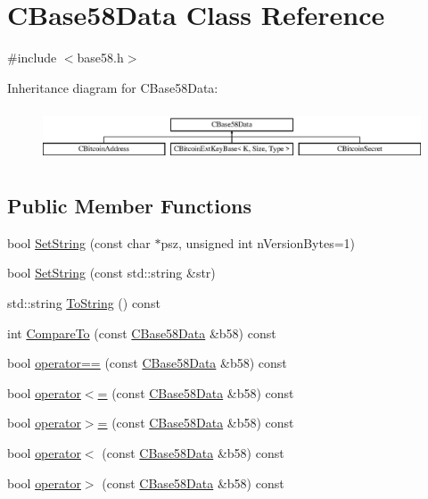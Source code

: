 \hypertarget{class_c_base58_data}{}\section{C\+Base58\+Data Class Reference}
\label{class_c_base58_data}


{\ttfamily \#include $<$base58.\+h$>$}

Inheritance diagram for C\+Base58\+Data\+:\begin{figure}[H]
\begin{center}
\leavevmode
\includegraphics[height=1.581921cm]{class_c_base58_data}
\end{center}
\end{figure}
\subsection*{Public Member Functions}
\begin{DoxyCompactItemize}
\item 
bool \hyperlink{class_c_base58_data_a250fa3bc97d03c7d87de5485c8b49b57}{Set\+String} (const char $\ast$psz, unsigned int n\+Version\+Bytes=1)
\item 
bool \hyperlink{class_c_base58_data_a8e0cba75a3e0a5b21defaf1471d8659c}{Set\+String} (const std\+::string \&str)
\item 
std\+::string \hyperlink{class_c_base58_data_a9a47b10dadff15b8d6a6d0e63ce3ae32}{To\+String} () const 
\item 
int \hyperlink{class_c_base58_data_ab3d18fd9671a383937af7dd4ac2e890a}{Compare\+To} (const \hyperlink{class_c_base58_data}{C\+Base58\+Data} \&b58) const 
\item 
bool \hyperlink{class_c_base58_data_af6448549abaf34142668540a338d180d}{operator==} (const \hyperlink{class_c_base58_data}{C\+Base58\+Data} \&b58) const 
\item 
bool \hyperlink{class_c_base58_data_a126cabad3af6b7d3aec0d6498be1a028}{operator$<$=} (const \hyperlink{class_c_base58_data}{C\+Base58\+Data} \&b58) const 
\item 
bool \hyperlink{class_c_base58_data_a4a96e8ea3716509b307cacfc814e5622}{operator$>$=} (const \hyperlink{class_c_base58_data}{C\+Base58\+Data} \&b58) const 
\item 
bool \hyperlink{class_c_base58_data_a39bac58c4bc4f8abc74a24b769eb1f1d}{operator$<$} (const \hyperlink{class_c_base58_data}{C\+Base58\+Data} \&b58) const 
\item 
bool \hyperlink{class_c_base58_data_a427e472d2fef51aaa89c1a09229ac51a}{operator$>$} (const \hyperlink{class_c_base58_data}{C\+Base58\+Data} \&b58) const 
\end{DoxyCompactItemize}
